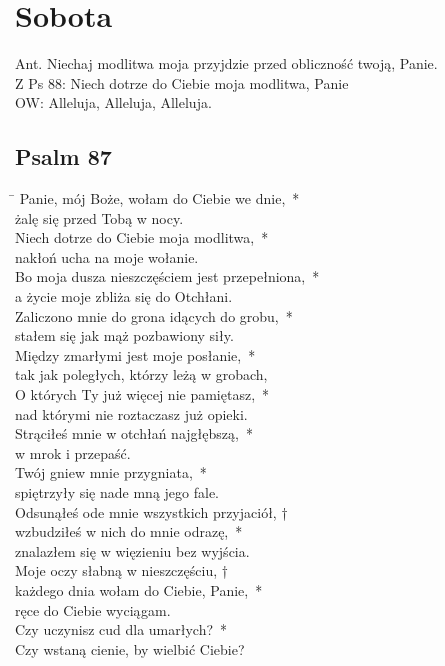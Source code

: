 \section*{Sobota}
Ant. Niechaj modlitwa moja przyjdzie przed obliczność twoją, Panie.\\
Z Ps 88: Niech dotrze do Ciebie moja modlitwa, Panie\\
OW: Alleluja, Alleluja, Alleluja.
\subsection*{Psalm 87}
\begin{tabbing}
\hspace{4mm} \= \>\kill
Panie, mój Boże, wołam do Ciebie we dnie,~*\\
żalę się przed Tobą w nocy.\\
\>Niech dotrze do Ciebie moja modlitwa,~*\\
\>nakłoń ucha na moje wołanie.\\
Bo moja dusza nieszczęściem jest przepełniona,~*\\
a życie moje zbliża się do Otchłani.\\
\>Zaliczono mnie do grona idących do grobu,~*\\
\>stałem się jak mąż pozbawiony siły.\\
Między zmarłymi jest moje posłanie,~*\\
tak jak poległych, którzy leżą w grobach,\\
\>O których Ty już więcej nie pamiętasz,~*\\
\>nad którymi nie roztaczasz już opieki.\\
Strąciłeś mnie w otchłań najgłębszą,~*\\
w mrok i przepaść.\\
\>Twój gniew mnie przygniata,~*\\
\>spiętrzyły się nade mną jego fale.\\
Odsunąłeś ode mnie wszystkich przyjaciół, †\\
wzbudziłeś w nich do mnie odrazę,~*\\
znalazłem się w więzieniu bez wyjścia.\\
\>Moje oczy słabną w nieszczęściu, †\\
\>każdego dnia wołam do Ciebie, Panie,~*\\
\>ręce do Ciebie wyciągam.\\
Czy uczynisz cud dla umarłych?~*\\
Czy wstaną cienie, by wielbić Ciebie?\\

\end{tabbing}
